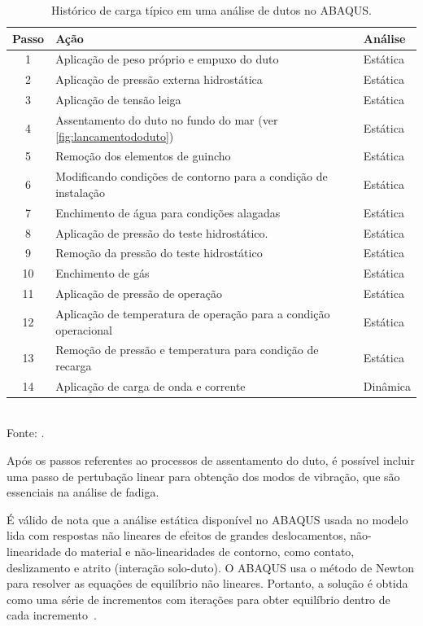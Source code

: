 \begin{table}[!ht]
\renewcommand{\arraystretch}{1.2}
\small
\centering
\caption{Histórico de carga típico em uma análise de dutos no ABAQUS.}\label{tab:load_steps}
\begin{tabular}{cll}
\toprule[1.5pt]

\textbf{Passo} & \textbf{Ação} & \textbf{Análise} \\
\midrule
1 & Aplicação de peso próprio e empuxo do duto & Estática \\
2 & Aplicação de pressão externa hidrostática & Estática \\
3 & Aplicação de tensão leiga & Estática \\
4 & Assentamento do duto no fundo do mar (ver \autoref{fig:lancamentododuto}) & Estática \\
5 & Remoção dos elementos de guincho & Estática \\
6 & Modificando condições de contorno para a condição de instalação & Estática \\
7 & Enchimento de água para condições alagadas & Estática \\
8 & Aplicação de pressão do teste hidrostático. & Estática \\
9 & Remoção da pressão do teste hidrostático & Estática \\
10 & Enchimento de gás & Estática \\
11 & Aplicação de pressão de operação & Estática \\
12 & Aplicação de temperatura de operação para a condição operacional & Estática \\
13 & Remoção de pressão e temperatura para condição de recarga & Estática \\
14 & Aplicação de carga de onda e corrente & Dinâmica \\

\bottomrule[1.25pt]
\end{tabular}
\\[6pt]
Fonte: .
\end{table}

Após os passos referentes ao processos de assentamento do duto, é possível incluir uma passo de pertubação linear para obtenção dos modos de vibração, que são essenciais na análise de fadiga.

É válido de nota que a análise estática disponível no ABAQUS usada no modelo lida com respostas não lineares de efeitos de grandes deslocamentos, não-linearidade do material e não-linearidades de contorno, como contato, deslizamento e atrito (interação solo-duto). O ABAQUS usa o método de Newton para resolver as equações de equilíbrio não lineares. Portanto, a solução é obtida como uma série de incrementos com iterações para obter equilíbrio dentro de cada incremento~\cite{SIMULIA2018}.

